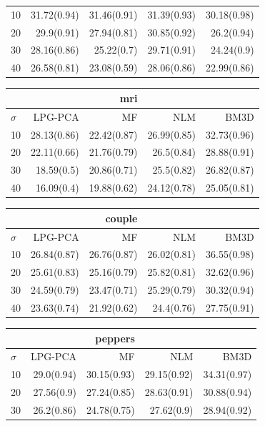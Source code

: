 {\begin{minipage}{.5\linewidth}
\begin{tabular}{lrrrr}
\midrule
10&31.72(0.94)&31.46(0.91)&31.39(0.93)&30.18(0.98)\\
20&29.9(0.91)&27.94(0.81)&30.85(0.92)&26.2(0.94)\\
30&28.16(0.86)&25.22(0.7)&29.71(0.91)&24.24(0.9)\\
40&26.58(0.81)&23.08(0.59)&28.06(0.86)&22.99(0.86)\\
\bottomrule
\end{tabular}
\end{minipage}
\noindent\begin{minipage}{.5\linewidth}
\begin{tabular}{lrrrr}
\toprule &&mri\\ \midrule
$\sigma$&LPG-PCA&MF&NLM&BM3D\\
\midrule
10&28.13(0.86)&22.42(0.87)&26.99(0.85)&32.73(0.96)\\
20&22.11(0.66)&21.76(0.79)&26.5(0.84)&28.88(0.91)\\
30&18.59(0.5)&20.86(0.71)&25.5(0.82)&26.82(0.87)\\
40&16.09(0.4)&19.88(0.62)&24.12(0.78)&25.05(0.81)\\
\bottomrule
\end{tabular}
\end{minipage}
\noindent\begin{minipage}{.5\linewidth}
\begin{tabular}{lrrrr}
\toprule &&couple\\ \midrule
$\sigma$&LPG-PCA&MF&NLM&BM3D\\
\midrule
10&26.84(0.87)&26.76(0.87)&26.02(0.81)&36.55(0.98)\\
20&25.61(0.83)&25.16(0.79)&25.82(0.81)&32.62(0.96)\\
30&24.59(0.79)&23.47(0.71)&25.29(0.79)&30.32(0.94)\\
40&23.63(0.74)&21.92(0.62)&24.4(0.76)&27.75(0.91)\\
\bottomrule
\end{tabular}
\end{minipage}
\noindent\begin{minipage}{.5\linewidth}
\begin{tabular}{lrrrr}
\toprule &&peppers\\ \midrule
$\sigma$&LPG-PCA&MF&NLM&BM3D\\
\midrule
10&29.0(0.94)&30.15(0.93)&29.15(0.92)&34.31(0.97)\\
20&27.56(0.9)&27.24(0.85)&28.63(0.91)&30.88(0.94)\\
30&26.2(0.86)&24.78(0.75)&27.62(0.9)&28.94(0.92)\\

\end{tabular}
\end{minipage}}
